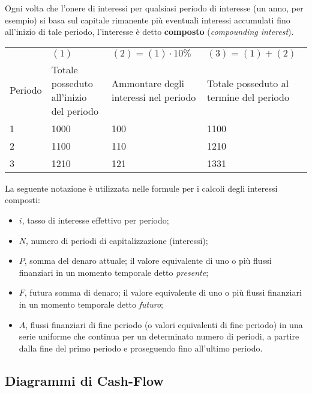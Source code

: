 \documentclass[a4paper,portrait,12pt]{article}
\theoremstyle{definition}
\begin{document}
Ogni volta che l'onere di interessi per qualsiasi periodo di interesse (un anno, per esempio) si basa sul capitale rimanente più eventuali interessi accumulati fino all'inizio di tale periodo, l'interesse è detto \textbf{composto} (\emph{compounding interest}).

\begin{table}
\begin{center}
\begin{tabular}{p{1.5cm}|p{3cm}p{3cm}p{3cm}}
\hline
& $(1)$ & $(2) = (1) \cdot 10\%$ & $(3) = (1) + (2)$ \\
Periodo & Totale posseduto all'inizio del periodo & Ammontare degli interessi nel periodo & Totale posseduto al termine del periodo\\
\hline
1 & 1000 & 100 & 1100\\
2 & 1100 & 110 & 1210\\
3 & 1210 & 121 & 1331\\
\hline
\end{tabular}
\end{center}
\end{table}

La seguente notazione è utilizzata nelle formule per i calcoli degli interessi composti:
\begin{itemize}
\item $i$, tasso di interesse effettivo per periodo;
\item $N$, numero di periodi di capitalizzazione (interessi);
\item $P$, somma del denaro attuale; il valore equivalente di uno o più flussi finanziari in un momento temporale detto \emph{presente};
\item $F$, futura somma di denaro; il valore equivalente di uno o più flussi finanziari in un momento temporale detto \emph{futuro};
\item $A$, flussi finanziari di fine periodo (o valori equivalenti di fine periodo) in una serie uniforme che continua per un determinato numero di periodi, a partire dalla fine del primo periodo e proseguendo fino all'ultimo periodo.
\end{itemize}

\subsection{Diagrammi di Cash-Flow}
\end{document}
